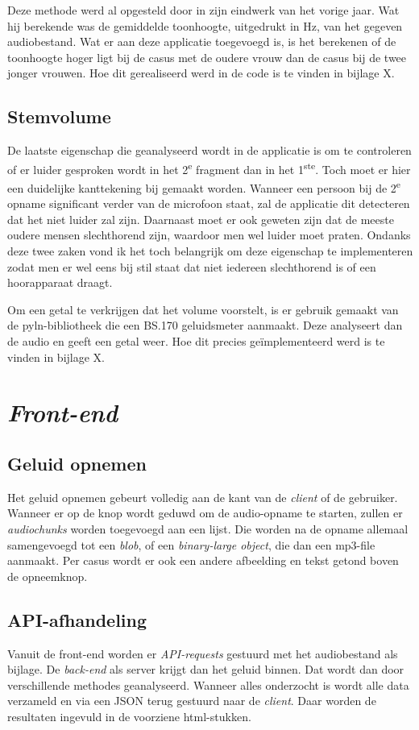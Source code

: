 Deze methode werd al opgesteld door \textcite{Standaert2021} in zijn eindwerk van het vorige jaar. Wat hij berekende was de gemiddelde toonhoogte, uitgedrukt in Hz, van het gegeven audiobestand. Wat er aan deze applicatie toegevoegd is, is het berekenen of de toonhoogte hoger ligt bij de casus met de oudere vrouw dan de casus bij de twee jonger vrouwen.
Hoe dit gerealiseerd werd in de code is te vinden in bijlage X.

\subsection{Stemvolume}
De laatste eigenschap die geanalyseerd wordt in de applicatie is om te controleren of er luider gesproken wordt in het 2\textsuperscript{e} fragment dan in het 1\textsuperscript{ste}. Toch moet er hier een duidelijke kanttekening bij gemaakt worden. Wanneer een persoon bij de 2\textsuperscript{e} opname significant verder van de microfoon staat, zal de applicatie dit detecteren dat het niet luider zal zijn. Daarnaast moet er ook geweten zijn dat de meeste oudere mensen slechthorend zijn, waardoor men wel luider moet praten. Ondanks deze twee zaken vond ik het toch belangrijk om deze eigenschap te implementeren zodat men er wel eens bij stil staat dat niet iedereen slechthorend is of een hoorapparaat draagt.

Om een getal te verkrijgen dat het volume voorstelt, is er gebruik gemaakt van de pyln-bibliotheek die een BS.170 geluidsmeter aanmaakt. Deze analyseert dan de audio en geeft een getal weer. Hoe dit precies geïmplementeerd werd is te vinden in bijlage X.

\section{\textit{Front-end}}
\subsection{Geluid opnemen}
Het geluid opnemen gebeurt volledig aan de kant van de \textit{client} of de gebruiker. Wanneer er op de knop wordt geduwd om de audio-opname te starten, zullen er \textit{audiochunks } worden toegevoegd aan een lijst. Die worden na de opname allemaal samengevoegd tot een \textit{blob}, of een \textit{binary-large object}, die dan een mp3-file aanmaakt.
Per casus wordt er ook een andere afbeelding en tekst getond boven de opneemknop.

\subsection{API-afhandeling}
Vanuit de front-end worden er \textit{API-requests} gestuurd met het audiobestand als bijlage. De \textit{back-end} als server krijgt dan het geluid binnen. Dat wordt dan door verschillende methodes geanalyseerd. Wanneer alles onderzocht is wordt alle data verzameld en via een JSON terug gestuurd naar de \textit{client}. Daar worden de resultaten ingevuld in de voorziene html-stukken.

